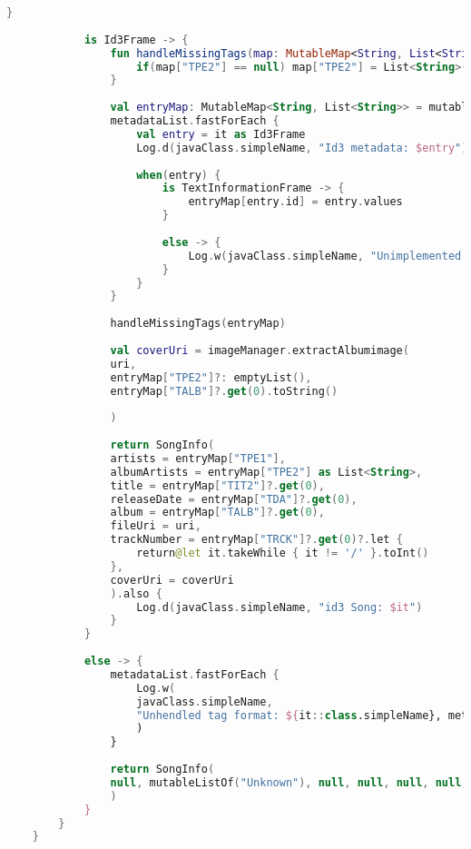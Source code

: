 \begin{lstlisting}[caption=Metoda \texttt{buildSongInfo()}, label={lst:Tag-buildsonginfo}, language=kotlin]
			}
			
			is Id3Frame -> {
				fun handleMissingTags(map: MutableMap<String, List<String>>) {
					if(map["TPE2"] == null) map["TPE2"] = List<String>(1,{"Unknown"} )
				}
				
				val entryMap: MutableMap<String, List<String>> = mutableMapOf()
				metadataList.fastForEach {
					val entry = it as Id3Frame
					Log.d(javaClass.simpleName, "Id3 metadata: $entry")
					
					when(entry) {
						is TextInformationFrame -> {
							entryMap[entry.id] = entry.values
						}
						
						else -> {
							Log.w(javaClass.simpleName, "Unimplemented id3 frame: $entry")
						}
					}
				}
				
				handleMissingTags(entryMap)
				
				val coverUri = imageManager.extractAlbumimage(
				uri,
				entryMap["TPE2"]?: emptyList(),
				entryMap["TALB"]?.get(0).toString()
				
				)
				
				return SongInfo(
				artists = entryMap["TPE1"],
				albumArtists = entryMap["TPE2"] as List<String>,
				title = entryMap["TIT2"]?.get(0),
				releaseDate = entryMap["TDA"]?.get(0),
				album = entryMap["TALB"]?.get(0),
				fileUri = uri,
				trackNumber = entryMap["TRCK"]?.get(0)?.let {
					return@let it.takeWhile { it != '/' }.toInt()
				},
				coverUri = coverUri
				).also {
					Log.d(javaClass.simpleName, "id3 Song: $it")
				}
			}
			
			else -> {
				metadataList.fastForEach {
					Log.w(
					javaClass.simpleName,
					"Unhendled tag format: ${it::class.simpleName}, metadata: $it"
					)
				}
				
				return SongInfo(
				null, mutableListOf("Unknown"), null, null, null, null, null, null
				)
			}
		}
	}
\end{lstlisting}

